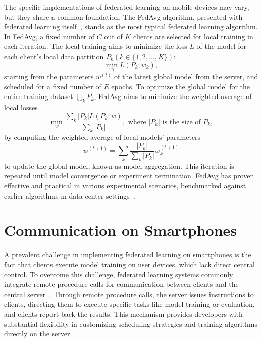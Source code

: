 The specific implementations of federated learning on mobile devices may vary,
but they share a common foundation. The FedAvg algorithm,
presented with federated learning itself~\cite{mcmahan2017communication},
stands as the most typical federated learning algorithm. In FedAvg,
a fixed number of $C$ out of $K$ clients are selected for local training in each
iteration.
The local training aims to minimize the loss $L$ of the model for each client's
local data partition $P_k (k \in \{1, 2, \dots, K\})$:
\begin{equation}
\min_{w_k} L(P_k;w_k),
\end{equation}
starting from the parameters $w^{(t)}$ of the latest global model from the
server, and scheduled for a fixed number of $E$ epochs.
To optimize the global model for the entire training dataset $\bigcup_k P_k$,
FedAvg aims to minimize the weighted average of local losses
\begin{equation}
\min_{w} \frac{\sum_k |P_k|L(P_k;w)}{\sum_k |P_k|},
\text{ where }|P_k|\text{ is the size of }P_k,
\end{equation}
by computing the weighted average of local models' parameters
\begin{equation}
    \label{eq:aggregation}
w^{(t+1)}=\sum_k \frac{|P_k|}{\sum_k |P_k|}w_k^{(t+1)}
\end{equation}
to update the global model, known as model aggregation.
This iteration is repeated until model convergence or experiment termination.
FedAvg has proven effective and practical in various experimental scenarios,
benchmarked against earlier algorithms in data center
settings~\cite{bonawitz2019towards}.

\section{Communication on Smartphones}

A prevalent challenge in implementing federated learning on smartphones is the
fact that clients execute model training on user devices,
which lack direct central control. To overcome this challenge,
federated learning systems commonly integrate remote procedure calls
for communication between clients and the central
server~\cite{tff,he2020fedml,beutel2020flower,patrick2022openfl,madrigal2023project}.
Through remote procedure calls, the server issues instructions to clients,
directing them to execute specific tasks like model training or evaluation,
and clients report back the results.
This mechanism provides developers with substantial flexibility in customizing
scheduling strategies and training algorithms directly on the server.

